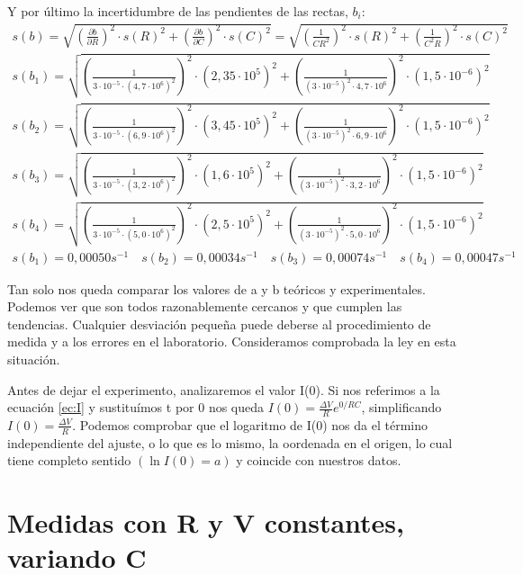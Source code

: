 \documentclass[12pt, a4paper, titlepage]{article}
\begin{document}
  Y por último la incertidumbre de las pendientes de las rectas, $b_i$:
  \begin{gather}
    s(b) = \sqrt{\left(\frac{\partial b}{\partial R}\right)^2 \cdot s(R)^2 + \left(\frac{\partial b}{\partial C}\right)^2 \cdot s(C)^2} = \sqrt{\left(\frac{1}{C R^2}\right)^2 \cdot s(R)^2 + \left(\frac{1}{C^2 R}\right)^2 \cdot s(C)^2} \label{ec:sbteo} \\
    s(b_1) = \sqrt{\left(\frac{1}{3 \cdot 10^{-5} \cdot (4,7 \cdot 10^6)^2}\right)^2 \cdot (2,35 \cdot 10^5)^2 + \left(\frac{1}{(3 \cdot 10^{-5})^2 \cdot 4,7 \cdot 10^6}\right)^2 \cdot (1,5 \cdot 10^{-6})^2} \nonumber \\
    s(b_2) = \sqrt{\left(\frac{1}{3 \cdot 10^{-5} \cdot (6,9 \cdot 10^6)^2}\right)^2 \cdot (3,45 \cdot 10^5)^2 + \left(\frac{1}{(3 \cdot 10^{-5})^2 \cdot 6,9 \cdot 10^6}\right)^2 \cdot (1,5 \cdot 10^{-6})^2} \nonumber \\
    s(b_3) = \sqrt{\left(\frac{1}{3 \cdot 10^{-5} \cdot (3,2 \cdot 10^6)^2}\right)^2 \cdot (1,6 \cdot 10^5)^2 + \left(\frac{1}{(3 \cdot 10^{-5})^2 \cdot 3,2 \cdot 10^6}\right)^2 \cdot (1,5 \cdot 10^{-6})^2} \nonumber \\
    s(b_4) = \sqrt{\left(\frac{1}{3 \cdot 10^{-5} \cdot (5,0 \cdot 10^6)^2}\right)^2 \cdot (2,5 \cdot 10^5)^2 + \left(\frac{1}{(3 \cdot 10^{-5})^2 \cdot 5,0 \cdot 10^6}\right)^2 \cdot (1,5 \cdot 10^{-6})^2} \nonumber \\
    s(b_1) = 0,00050 s^{-1} \quad s(b_2) = 0,00034 s^{-1} \quad s(b_3) = 0,00074 s^{-1} \quad s(b_4) = 0,00047 s^{-1} \nonumber
  \end{gather}

  Tan solo nos queda comparar los valores de a y b teóricos y experimentales. Podemos ver que son todos razonablemente cercanos y que cumplen las tendencias. Cualquier desviación pequeña puede deberse al procedimiento de medida y a los errores en el laboratorio. Consideramos comprobada la ley en esta situación.

  Antes de dejar el experimento, analizaremos el valor I(0). Si nos referimos a la ecuación \ref{ec:I} y sustituímos t por 0 nos queda $I(0) = \frac{\Delta V}{R}e^{0/RC}$, simplificando $I(0) = \frac{\Delta V}{R}$. Podemos comprobar que el logaritmo de I(0) nos da el término independiente del ajuste, o lo que es lo mismo, la oordenada en el origen, lo cual tiene completo sentido $(\ln{I(0)} = a)$ y coincide con nuestros datos.


  \newpage
  \section{Medidas con \textbf{R} y \textbf{V} constantes, variando \textbf{C}}
\end{document}
